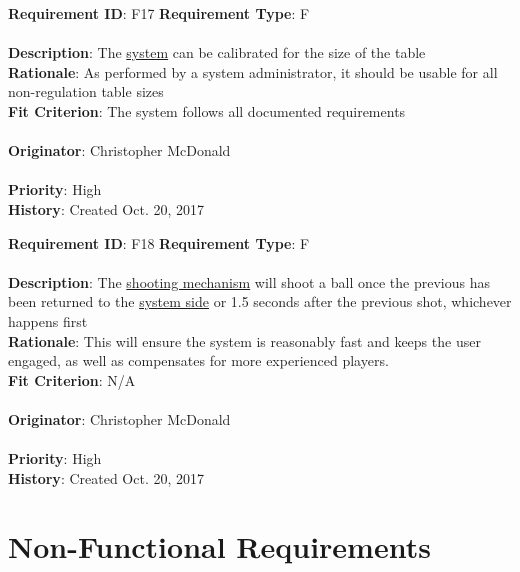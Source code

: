 \documentclass[11pt]{article}
\begin{document}
\begin{framed}
	\noindent\textbf{Requirement ID}: F17 \hfill \textbf{Requirement Type}: F \hfill\\\\
	\noindent\textbf{Description}: The \hyperref[sec:definitions]{system} can be calibrated for the size of the table \\
	\textbf{Rationale}: As performed by a system administrator, it should be usable for all non-regulation table sizes \\
	\textbf{Fit Criterion}: The system follows all documented requirements \\\\
	\textbf{Originator}: Christopher McDonald \\\\
	\textbf{Priority}: High \hfill \\
	\noindent\textbf{History}: Created Oct. 20, 2017
\end{framed}

\begin{framed}
	\noindent\textbf{Requirement ID}: F18 \hfill \textbf{Requirement Type}: F \hfill\\\\
	\noindent\textbf{Description}: The \hyperref[sec:definitions]{shooting mechanism} will shoot a ball once the previous has been returned to the \hyperref[sec:definitions]{system side} or 1.5 seconds after the previous shot, whichever happens first\\
	\textbf{Rationale}: This will ensure the system is reasonably fast and keeps the user engaged, as well as compensates for more experienced players. \\
	\textbf{Fit Criterion}: N/A \\\\
	\textbf{Originator}: Christopher McDonald \\\\
	\textbf{Priority}: High \hfill \\
	\noindent\textbf{History}: Created Oct. 20, 2017
\end{framed}

\section{Non-Functional Requirements}
\end{document}
